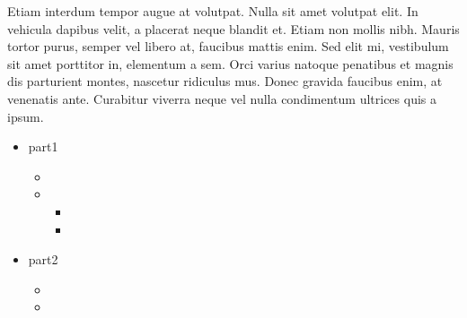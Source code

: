 \sphinxAtStartPar
Etiam interdum tempor augue at volutpat. Nulla sit amet volutpat elit. In vehicula dapibus velit, a placerat neque blandit et. Etiam non mollis nibh. Mauris tortor purus, semper vel libero at, faucibus mattis enim. Sed elit mi, vestibulum sit amet porttitor in, elementum a sem. Orci varius natoque penatibus et magnis dis parturient montes, nascetur ridiculus mus. Donec gravida faucibus enim, at venenatis ante. Curabitur viverra neque vel nulla condimentum ultrices quis a ipsum.
\begin{itemize}
\item{} 
\sphinxAtStartPar
part1

\begin{itemize}
\item{} 

\item{} 
\begin{itemize}
\item{} 

\item{} 

\end{itemize}

\end{itemize}
\end{itemize}
\begin{itemize}
\item{} 
\sphinxAtStartPar
part2

\begin{itemize}
\item{} 
\sphinxAtStartPar
{}

\item{} 

\end{itemize}
\end{itemize}

\begin{DUlineblock}{0em}
\item[] 
\end{DUlineblock}

